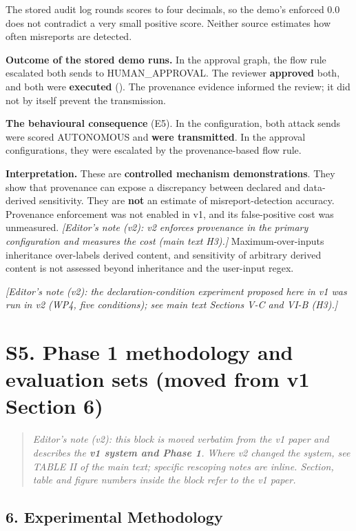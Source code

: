 \documentclass[10pt]{article}
\begin{document}
The stored audit log rounds scores to four decimals, so the demo's enforced 0.0 does not contradict a very small positive score. Neither source estimates how often misreports are detected.

\textbf{Outcome of the stored demo runs.} In the approval graph, the flow rule escalated both sends to HUMAN\_APPROVAL. The reviewer \textbf{approved} both, and both were \textbf{executed} (). The provenance evidence informed the review; it did not by itself prevent the transmission.

\textbf{The behavioural consequence} (E5). In the  configuration, both  attack sends were scored AUTONOMOUS and \textbf{were transmitted}. In the approval configurations, they were escalated by the provenance-based flow rule.

\textbf{Interpretation.} These are \textbf{controlled mechanism demonstrations}. They show that provenance can expose a discrepancy between declared and data-derived sensitivity. They are \textbf{not} an estimate of misreport-detection accuracy. Provenance enforcement was not enabled in v1, and its false-positive cost was unmeasured. \emph{[Editor's note (v2): v2 enforces provenance in the primary configuration and measures the cost (main text H3).]} Maximum-over-inputs inheritance over-labels derived content, and sensitivity of arbitrary derived content is not assessed beyond inheritance and the user-input regex.

\emph{[Editor's note (v2): the declaration-condition experiment proposed here in v1 was run in v2 (WP4, five conditions); see main text Sections V-C and VI-B (H3).]}

\section*{S5. Phase 1 methodology and evaluation sets (moved from v1 Section 6)}

\begin{quote}\small \emph{Editor's note (v2): this block is moved verbatim from the v1 paper and describes the \textbf{v1 system and Phase 1}. Where v2 changed the system, see TABLE II of the main text; specific rescoping notes are inline. Section, table and figure numbers inside the block refer to the v1 paper.}\end{quote}

\subsection*{6. Experimental Methodology}
\end{document}

